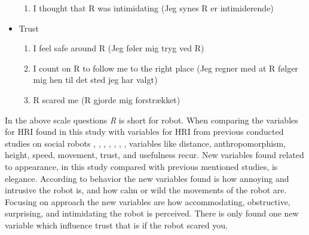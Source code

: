 \begin{itemize}
\begin{enumerate}
  \item I thought that R was intimidating (Jeg synes R er intimiderende)
\end{enumerate}
\item Trust 
\begin{enumerate}
  \item I feel safe around R (Jeg føler mig tryg ved R)
  \item I count on R to follow me to the right place (Jeg regner med at R følger mig hen til det sted jeg har valgt)
  \item R scared me (R gjorde mig forstrækket)\\
\end{enumerate}
\end{itemize}
%
In the above scale questions \textit{R} is short for robot. When comparing the variables for HRI found in this study with variables for HRI from previous conducted studies on social robots \cite{PDF:ExploringInfluencingVariable}, \cite{PDF:SharingALifeHarvey}, \cite{PDF:InTheCompanyofRobots}, \cite{PDF:CloseButNotStuck}, \cite{PDF:TheImpactOfTraveler}, \cite{PDF:HumanRobotEmodiedInteraction}, \cite{PDF:RecommendationEffects}, variables like distance, anthropomorphism, height, speed, movement, trust, and usefulness recur. New variables found related to appearance, in this study compared with previous mentioned studies, is elegance. According to behavior the new variables found is how annoying and intrusive the robot is, and how calm or wild the movements of the robot are. Focusing on approach the new variables are how accommodating, obstructive, surprising, and intimidating the robot is perceived. There is only found one new variable which influence trust that is if the robot scared you. 

